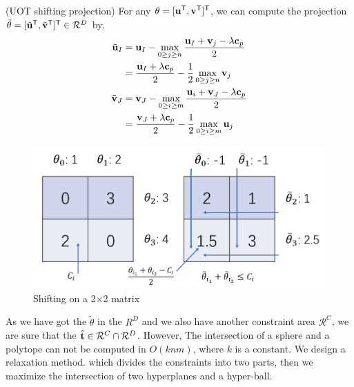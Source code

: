 \begin{thm}
(UOT shifting projection) For any $\theta = [{\mathbf u}^{\mathsf T},{\mathbf v}^{\mathsf T}]^{\mathsf T}$, we can compute the projection $\tilde{\theta} = [\tilde{\mathbf u}^{\mathsf T},\tilde{\mathbf v}^{\mathsf T}]^{\mathsf T} \in \mathcal{R}^{D}$ by.
\begin{equation}
\begin{split}
\tilde{\mathbf u}_I &= {\mathbf u}_I - \max_{0\geq j\geq n} \frac{{\mathbf u}_I +{\mathbf v}_j - \lambda\mathbf c_{p}}{2}\\
& = \frac{{\mathbf u}_I +\lambda\mathbf c_{p}}{2} - \frac{1}{2}\max_{0\geq j\geq n} {\mathbf v}_j\\
\tilde{\mathbf v}_J &= {\mathbf v}_J - \max_{0 \geq i \geq m} \frac{{\mathbf u}_i +{\mathbf v}_J - \lambda\mathbf c_{p}}{2}\\
& = \frac{{\mathbf v}_J +\lambda\mathbf c_{p}}{2} - \frac{1}{2}\max_{0\geq i\geq m} {\mathbf u}_j
 \end{split}
 \label{eq:uotproj}
\end{equation}
\end{thm}
	\begin{figure}[h]
	\begin{center}	
	\includegraphics[width = \linewidth]{pic/shifting}
	\caption{Shifting on a 2$\times$2 matrix}
	\end{center}	
	\end{figure}


As we have got the $\tilde{\theta}$ in the $R^{D}$ and we also have another constraint area $\mathcal{R}^{C}$, we are sure that the $\hat{\mathbf t} \in \mathcal{R}^{C}\cap\mathcal{R}^{D}$. However, The intersection of a sphere and a polytope can not be computed in $O(knm)$, where $k$ is a constant. We design a relaxation method. which divides the constraints into two parts, then we maximize the intersection of two hyperplanes and a hyper-ball. 

